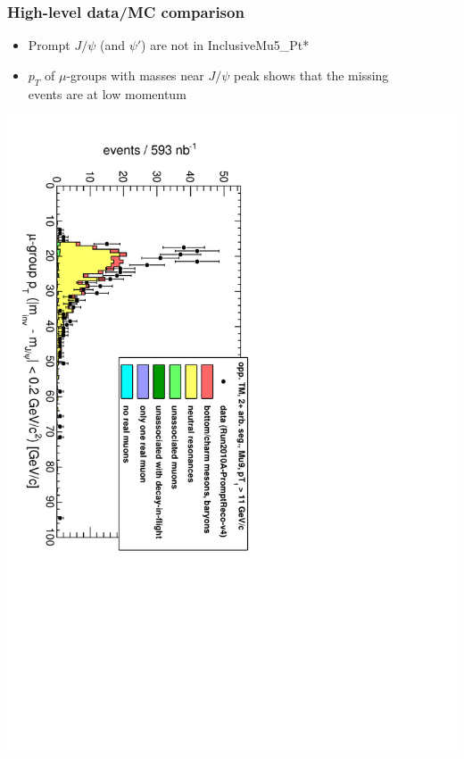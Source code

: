 \documentclass[compress]{beamer}
\begin{document}
\begin{frame}
\frametitle{High-level data/MC comparison}
\begin{itemize}
\item Prompt $J/\psi$ (and $\psi'$) are not in InclusiveMu5\_Pt*
\item $p_T$ of $\mu$-groups with masses near $J/\psi$ peak shows that the missing \\ \hspace{5.15 cm} events are at low momentum
\end{itemize}

\vspace{-0.3 cm}
\vspace{1.5 cm}
\hfill \includegraphics[height=0.9\linewidth, angle=90]{Mu9_pt_jpsi.pdf}


\end{frame}
\end{document}
